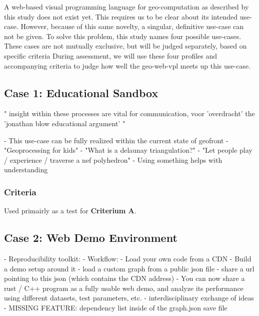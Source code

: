 A web-based visual programming language for geo-computation as described by this study does not exist yet. 
This requires us to be clear about its intended use-case. 
However, because of this same novelty, a singular, definitive use-case can not be given.
To solve this problem, this study names four possible use-cases.  
These cases are not mutually exclusive, but will be judged separately, based on specific criteria 
During assessment, we will use these four profiles and accompanying criteria to judge how well the geo-web-vpl meets up this use-case.

\subsection*{Case 1: Educational Sandbox}

"
insight within these processes are vital for communication, voor 'overdracht' 
the 'jonathan blow educational argument' 
"

- This use-case can be fully realized within the current state of geofront
- "Geoprocessing for kids"
- "What is a delaunay triangulation?" 
- "Let people play / experience / traverse a nef polyhedron"
- Using something helps with understanding

\subsubsection*{Criteria}
Used primairly as a test for \textbf{Criterium A}.


\subsection*{Case 2: Web Demo Environment}

- Reproducibility toolkit:
- Workflow: 
  - Load your own code from a CDN
  - Build a demo setup around it
  - load a custom graph from a public json file
  - share a url pointing to this json (which contains the CDN address)
- You can now share a rust / C++ program as a fully usable web demo,   
  and analyze its performance using different datasets, test parameters, etc. 
- interdisciplinary exchange of ideas
- MISSING FEATURE: dependency list inside of the graph.json save file

